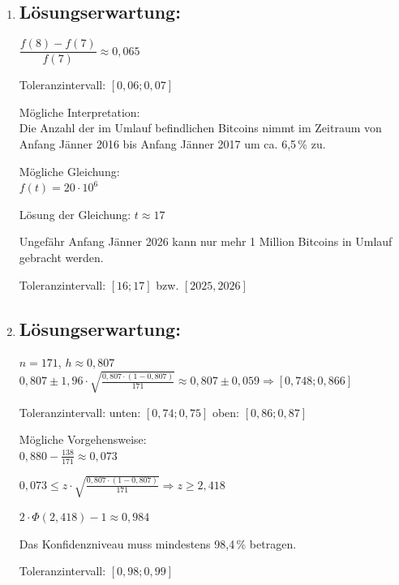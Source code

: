 \begin{langesbeispiel}
{\begin{enumerate}
$\dfrac{K_2-K_1}{AT}\approx -1,8$

Mögliche Interpretation:\\
Im August 2015 betrug die durchschnittliche Kursänderung pro Tag ca. .\\
oder:\\
Im August 2015 betrug der durchschnittliche Kursverlust pro Tag ca. .

Toleranzintervall: $[-2,3;-1,5]$ bzw. $[1,5;2,3]$

\item \subsection{Lösungserwartung:} 

$\dfrac{f(8)-f(7)}{f(7)}\approx 0,065$

Toleranzintervall: $[0,06;0,07]$

Mögliche Interpretation:\\
Die Anzahl der im Umlauf befindlichen Bitcoins nimmt im Zeitraum von Anfang Jänner 2016 bis Anfang Jänner 2017 um ca. 6,5\,\% zu.\leer

Mögliche Gleichung:\\
$f(t)=20\cdot 10^6$

Lösung der Gleichung: $t\approx 17$

Ungefähr Anfang Jänner 2026 kann nur mehr 1 Million Bitcoins in Umlauf gebracht werden.

Toleranzintervall: $[16;17]$ bzw. $[2025,2026]$
\item \subsection{Lösungserwartung:}

$n=171$, $h\approx 0,807$\\
$0,807\pm 1,96\cdot\sqrt{\frac{0,807\cdot(1-0,807)}{171}}\approx 0,807\pm 0,059 \Rightarrow [0,748;0,866]$

Toleranzintervall: unten: $[0,74;0,75]$ oben: $[0,86;0,87]$\leer

Mögliche Vorgehensweise:\\
$0,880-\frac{138}{171}\approx 0,073$

$0,073\leq z\cdot \sqrt{\frac{0,807\cdot(1-0,807)}{171}} \Rightarrow z\geq 2,418$

$2\cdot\Phi(2,418)-1\approx 0,984$

Das Konfidenzniveau muss mindestens 98,4\,\% betragen.

Toleranzintervall: $[0,98;0,99]$
\end{enumerate}}
	
	\end{langesbeispiel}